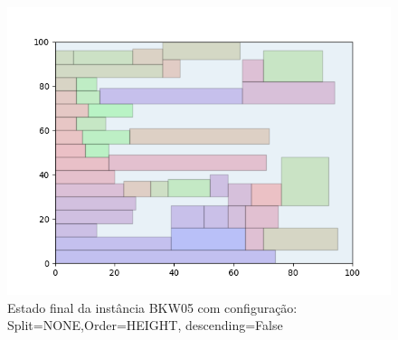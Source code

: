 \begin{figure}[H]
    \centering
    \caption[]{Estado final da instância BKW05 com configuração: Split=NONE,Order=HEIGHT, descending=False}
    \label{fig:bkw05-none-height-false}
    \includegraphics[scale=0.5]{output/figures/bkw/bkw05/none/height/false/00}
\end{figure}